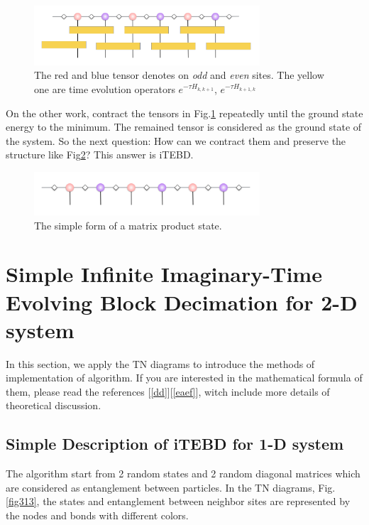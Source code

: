 \begin{figure}[ht]
	\centering
	\includegraphics[width=0.75\textwidth]{figures/fig312.png}
	\caption[The picture of the main idea of itebd.]{The red and blue tensor denotes on \textit{odd} and \textit{even} sites. The yellow one are time evolution operators $e^{-\tau H_{k,k+1}}$, $e^{-\tau H_{k+1,k}}$}
	\label{fig312}
\end{figure}

On the other work, contract the tensors in Fig.\ref{fig312} repeatedly until the ground state energy to the minimum. The remained tensor is considered as the ground state of the system. So the next question: How can we contract them and preserve the structure like Fig{\ref{fig311}}? This answer is iTEBD.

\begin{figure}[ht]
	\centering
	\includegraphics[width=0.75\textwidth]{figures/fig311.png}
	\caption[The picture of matrix product states]{The simple form of a matrix product state.}
	\label{fig311}
\end{figure}

\section{Simple Infinite Imaginary-Time Evolving Block Decimation for 2-D system}
In this section, we apply the TN diagrams to introduce the methods of implementation of algorithm. If you are interested in the mathematical formula of them, please read the references \citep{vidal_efficient_2004} [\ref{dd}][\ref{eaef}], witch include more details of theoretical discussion.

\label{itebd}
\subsection{Simple Description of iTEBD for 1-D system}

The algorithm start from 2 random states and 2 random diagonal matrices which are considered as entanglement between particles. In the TN diagrams, Fig.\ref{fig313}, the states and entanglement between neighbor sites are represented by the nodes and bonds with different colors.

